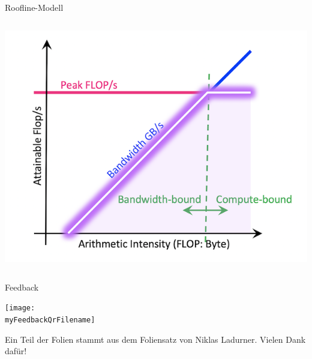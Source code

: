 \documentclass[
  german,            %
  aspectratio=169,    %
]{tumbeamer}
\begin{document}
\begin{frame}[c, fragile]{Roofline-Modell}{}
\begin{columns}[c]
\begin{column}{0.5\textwidth}
			\includegraphics[width=\textwidth]{w10_roofline_google.png}
		\end{column}
	\end{columns}
\end{frame}


\begin{frame}[c]{Feedback}{} 
  \begin{center}
    \texttt{[image: \\myFeedbackQrFilename]}
  \end{center}
  \begin{center}
    \LARGE \href{\myFeedbackLink}{\myFeedbackLink}
  \end{center}
  \vspace{0.5cm}
  \begin{center}
    \small Ein Teil der Folien stammt aus dem Foliensatz von Niklas Ladurner. Vielen Dank dafür!
  \end{center}
\end{frame}
\end{document}
